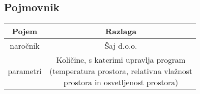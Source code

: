 \documentclass[a4paper,12pt]{article}
\newcommand{\mlc}[1]{\raisebox{0ex}{\makecell{#1}}}
\begin{document}
\newpage

	\subsection{Pojmovnik}
		
		\begin{center}
				\begin{tabular}{|c|c|}
					\hline
				    \rowcolor{green!20!}Pojem&Razlaga\\
					\hline
				    \hline
					naročnik&Šaj d.o.o.\\
					\hline
					parametri&\mlc{Količine, s katerimi upravlja program \\(temperatura prostora, relativna vlažnost \\ prostora in osvetljenost prostora)}\\
					\hline
			\end{tabular}
		\end{center}
\end{document}

